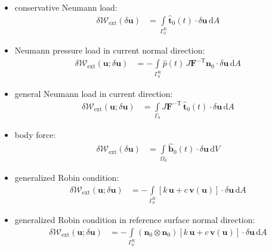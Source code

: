 \documentclass[a4paper,12pt]{report}
\newcommand{\bs}[1]{\boldsymbol{#1}}
\newcommand{\Om}{\mathit{\Omega}}
\newcommand{\Gm}{\mathit{\Gamma}}
\begin{document}
\begin{itemize}
\item conservative Neumann load:
\begin{align}
\delta \mathcal{W}_{\mathrm{ext}}(\delta\bs{u}) &= \int\limits_{\Gm_{0}^{\mathrm{N}}} \hat{\bs{t}}_{0}(t) \cdot \delta\bs{u} \,\mathrm{d}A \label{eq:deltaWext_pk1}
\end{align}
\item Neumann pressure load in current normal direction:
\begin{align}
\delta \mathcal{W}_{\mathrm{ext}}(\bs{u};\delta\bs{u}) &= -\int\limits_{\Gm_{0}^{\mathrm{N}}} \hat{p}(t)\,J \bs{F}^{-\mathrm{T}}\bs{n}_{0} \cdot \delta\bs{u} \,\mathrm{d}A \label{eq:deltaWext_cur_p}
\end{align}
\item general Neumann load in current direction:
\begin{align}
\delta \mathcal{W}_{\mathrm{ext}}(\bs{u};\delta\bs{u}) &= \int\limits_{\Gm_0} J\boldsymbol{F}^{-\mathrm{T}}\,\hat{\boldsymbol{t}}_{0}(t) \cdot \delta\boldsymbol{u} \,\mathrm{d}A \label{eq:deltaWext_cur}
\end{align}
\item body force:
\begin{align}
\delta \mathcal{W}_{\mathrm{ext}}(\delta\bs{u}) &= \int\limits_{\Om_{0}} \hat{\bs{b}}_{0}(t) \cdot \delta\bs{u} \,\mathrm{d}V \label{eq:deltaWext_body}
\end{align}

\item generalized Robin condition:
\begin{align}
\delta \mathcal{W}_{\mathrm{ext}}(\bs{u};\delta\bs{u}) &= -\int\limits_{\Gm_{0}^{\mathrm{N}}} \left[k\,\bs{u} + c\,\bs{v}(\bs{u})\right] \cdot \delta\bs{u}\,\mathrm{d}A \label{eq:deltaWext_rob}
\end{align} 
\item generalized Robin condition in reference surface normal direction:
\begin{align}
\delta \mathcal{W}_{\mathrm{ext}}(\bs{u};\delta\bs{u}) &= -\int\limits_{\Gm_{0}^{\mathrm{N}}} (\bs{n}_0 \otimes \bs{n}_0)\left[k\,\bs{u} + c\,\bs{v}(\bs{u})\right] \cdot \delta\bs{u}\,\mathrm{d}A \label{eq:deltaWext_robn}
\end{align}

\end{itemize}
\end{document}
